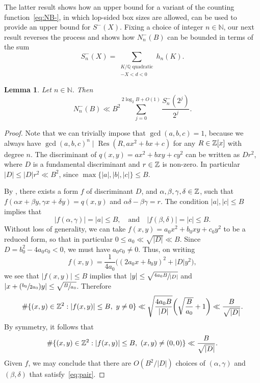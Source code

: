 \documentclass[11pt]{article}
\newcommand{\Psfrac}[2]{(\sfrac{#1}{#2})}
\DeclareMathOperator{\Res}{Res}
\newcommand{\NN}{\mathbb{N}}
\newcommand{\QQ}{\mathbb{Q}}\let\Q\QQ
\newtheorem{lemma}[theorem]{Lemma}
\numberwithin{equation}{section}
\begin{document}
The latter result shows how an upper bound for a variant of the counting function~\eqref{eq:NB-},
in which lop-sided box sizes are allowed, can be used to provide an upper bound for $S^-(X)$.
Fixing a choice of integer $n\in \NN$,
our next result reverses the process and shows how
$N_n^-(B)$ can be bounded in terms of the sum
\[
S_n^-(X)=
\sum_{
\substack{K/\QQ \text{ quadratic}\\
-X<d<0
}} h_n(K).
\]

\begin{lemma}
Let $n\in \NN$. Then
\[
N_n^-(B)\ll
B^2 \sum_{j=0}^{2\log_2 B+O(1)}
\frac{S_n^-(2^j)}{2^j}.
\]
\end{lemma}

\begin{proof}
Note that we can trivially impose that $\gcd(a,b,c)=1$, because we always have $\gcd(a,b,c)^n\mid \Res(R,ax^2+bx+c)$ for any $R\in\mathbb{Z}[x]$ with degree $n$.
The discriminant of $q(x,y)=ax^2+bxy+cy^2$ can be written as $Dr^2$, where $D$ is a fundamental discriminant and $r\in\mathbb{Z}$ is non-zero.
In particular $|D|\leq |D|r^2\ll B^2$, since $\max\{|a|,|b|,|c|\}\leq B$.

By \cite[Prop.\,7.1]{Buell}, there exists a form $f$ of discriminant $D$, and $\alpha,\beta,\gamma,\delta \in\mathbb{Z}$, such that $f(\alpha x+\beta y,\gamma x+\delta y)=q(x,y)$ and $\alpha\delta-\beta\gamma=r$.
The condition $|a|,|c|\leq B$ implies that
\begin{equation}\label{eq:pair}
|f(\alpha ,\gamma )|=|a|\leq B, \quad\text{and}\quad |f(\beta ,\delta )|=|c|\leq B.
\end{equation}
Without loss of generality, we can take $f(x,y)=a_0x^2+b_0xy+c_0y^2$ to be a reduced form, so that in particular $0\leq a_0\ll \sqrt{|D|}\ll B$. Since $D=b_0^2-4a_0c_0<0$, we must have $a_0c_0\neq0$. Thus, on writing
\[
f(x,y)=\frac{1}{4a_0}\bigl((2a_0x+b_0y)^2+|D|y^2\bigr),
\]
we see that $|f(x ,y)|\leq B$ implies that $|y|\leq\sqrt{ \sfrac{4a_0B}{|D|}}$ and $|x+\Psfrac{b_0}{2a_0}y|\leq \sqrt{\sfrac{B}{a_0}}$. Therefore
\[
\#\{(x,y)\in\mathbb{Z}^2: |f(x,y)|\leq B,\ y\neq 0\}\ll \sqrt{ \frac{4a_0B}{|D|}}\biggl( \sqrt{\frac{B}{a_0}}+1\biggr)\ll \frac{B}{\sqrt{|D|}}.
\]
By symmetry, it follows that
\[
\#\{(x,y)\in\mathbb{Z}^2: |f(x,y)|\leq B,\ (x,y)\neq (0,0)\}\ll \frac{B}{\sqrt{|D|}}.
\]
Given $f$, we may conclude that there are $O(B^2/|D|)$
choices of $(\alpha ,\gamma )$ and $(\beta ,\delta )$ that satisfy~\eqref{eq:pair}.


\end{proof}
\end{document}
